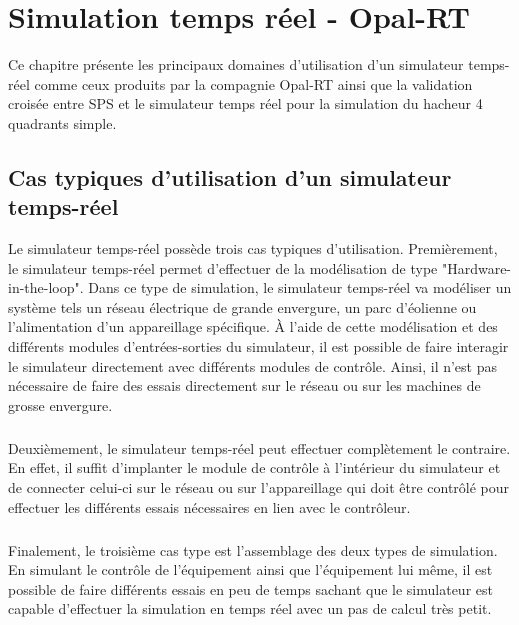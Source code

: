 \chapter{Simulation temps réel - Opal-RT}
Ce chapitre présente les principaux domaines d'utilisation d'un simulateur temps-réel comme ceux produits par la compagnie Opal-RT ainsi que la validation croisée entre SPS et le simulateur temps réel pour la simulation du hacheur 4 quadrants simple.

\section{Cas typiques d'utilisation d'un simulateur temps-réel}
Le simulateur temps-réel possède trois cas typiques d'utilisation. Premièrement, le simulateur temps-réel permet d'effectuer de la modélisation de type "Hardware-in-the-loop". Dans ce type de simulation, le simulateur temps-réel va modéliser un système tels un réseau électrique de grande envergure, un parc d'éolienne ou l'alimentation d'un appareillage spécifique. À l'aide de cette modélisation et des différents modules d'entrées-sorties du simulateur, il est possible de faire interagir le simulateur directement avec différents modules de contrôle. Ainsi, il n'est pas nécessaire de faire des essais directement sur le réseau ou sur les machines de grosse envergure.

\paragraph{} Deuxièmement, le simulateur temps-réel peut effectuer complètement le contraire. En effet, il suffit d'implanter le module de contrôle à l'intérieur du simulateur et de connecter celui-ci sur le réseau ou sur l'appareillage qui doit être contrôlé pour effectuer les différents essais nécessaires en lien avec le contrôleur.

\paragraph{} Finalement, le troisième cas type est l'assemblage des deux types de simulation. En simulant le contrôle de l'équipement ainsi que l'équipement lui même, il est possible de faire différents essais en peu de temps sachant que le simulateur est capable d'effectuer la simulation en temps réel avec un pas de calcul très petit.

